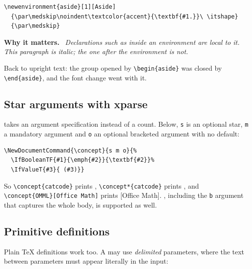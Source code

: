 \begin{verbatim}
\newenvironment{aside}[1][Aside]
  {\par\medskip\noindent\textcolor{accent}{\textbf{#1.}}\ \itshape}
  {\par\medskip}
\end{verbatim}
\newenvironment{aside}[1][Aside]
  {\par\medskip\noindent\textcolor{accent}{\textbf{#1.}}\ \itshape}
  {\par\medskip}

\begin{aside}[Why it matters]
Declarations such as  inside an environment are local to it. This
paragraph is italic; the one after the environment is not.
\end{aside}

Back to upright text: the group opened by \verb|\begin{aside}| was closed by
\verb|\end{aside}|, and the font change went with it.

\subsection{Star arguments with xparse}

 takes an argument specification instead of a count. Below,
\texttt{s} is an optional star, \texttt{m} a mandatory argument and \texttt{o} an
optional bracketed argument with no default:

\begin{verbatim}
\NewDocumentCommand{\concept}{s m o}{%
  \IfBooleanTF{#1}{\emph{#2}}{\textbf{#2}}%
  \IfValueT{#3}{ (#3)}}
\end{verbatim}

So \verb|\concept{catcode}| prints , \verb|\concept*{catcode}| prints
, and \verb|\concept{OMML}[Office Math]| prints
[Office Math]. , including the \texttt{b}
argument that captures the whole body, is supported as well.

\subsection{Primitive definitions}

Plain \TeX{} definitions work too. A  may use \emph{delimited} parameters, where the
text between parameters must appear literally in the input:

